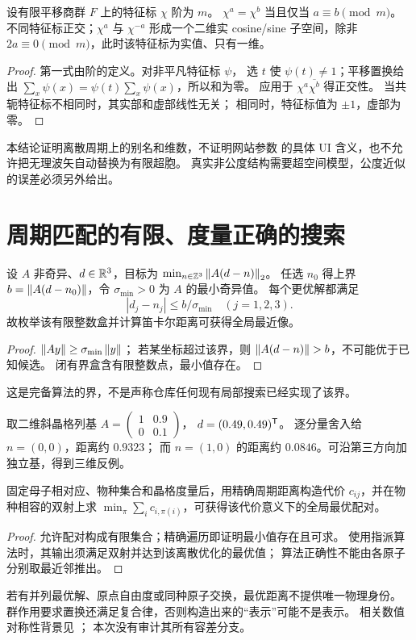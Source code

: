 \begin{theorem}[谐波别名和实模式维数]\label{thm:harmonics}
设有限平移商群 $F$ 上的特征标 $\chi$ 阶为 $m$。
$\chi^a=\chi^b$ 当且仅当 $a\equiv b\pmod m$。
不同特征标正交；$\chi^a$ 与 $\chi^{-a}$ 形成一个二维实
cosine/sine 子空间，除非 $2a\equiv0\pmod m$，此时该特征标为实值、只有一维。
\end{theorem}
\begin{proof}
第一式由阶的定义。对非平凡特征标 $\psi$，
选 $t$ 使 $\psi(t)\ne1$；平移置换给出
$\sum_x\psi(x)=\psi(t)\sum_x\psi(x)$，所以和为零。
应用于 $\chi^a\overline{\chi^b}$ 得正交性。
当共轭特征标不相同时，其实部和虚部线性无关；
相同时，特征标值为 $\pm1$，虚部为零。
\end{proof}
本结论证明离散周期上的别名和维数，不证明网站参数
 的具体 UI 含义，也不允许把无理波矢自动替换为有限超胞。
真实非公度结构需要超空间模型，公度近似的误差必须另外给出。

\section{周期匹配的有限、度量正确的搜索}\label{sec:matching}
\begin{theorem}[最近晶格像的完备有限界]
设 $A$ 非奇异、$d\in\mathbb R^3$，目标为
$\min_{n\in\mathbb Z^3}\left\lVert A(d-n)\right\rVert_2$。
任选 $n_0$ 得上界 $b=\left\lVert A(d-n_0)\right\rVert$，令 $\sigma_{\min}>0$ 为 $A$ 的最小奇异值。
每个更优解都满足
\[
 |d_j-n_j|\leq b/\sigma_{\min}\quad(j=1,2,3).
\]
故枚举该有限整数盒并计算笛卡尔距离可获得全局最近像。
\end{theorem}
\begin{proof}
$\left\lVert Ay\right\rVert\geq\sigma_{\min}\left\lVert y\right\rVert$；
若某坐标超过该界，则 $\left\lVert A(d-n)\right\rVert>b$，不可能优于已知候选。
闭有界盒含有限整数点，最小值存在。
\end{proof}
这是完备算法的界，不是声称仓库任何现有局部搜索已经实现了该界。
\begin{counterexample}[分数坐标逐分量舍入并不充分]
取二维斜晶格列基
$A=\left(\begin{smallmatrix}1&0.9\\0&0.1\end{smallmatrix}\right)$，
$d=(0.49,0.49)^\mathsf T$。
逐分量舍入给 $n=(0,0)$，距离约 $0.9323$；
而 $n=(1,0)$ 的距离约 $0.0846$。可沿第三方向加独立基，得到三维反例。
\end{counterexample}

\begin{proposition}[固定合同下的全局配对]
固定母子相对应、物种集合和晶格度量后，用精确周期距离构造代价
$c_{ij}$，并在物种相容的双射上求
$\min_\pi\sum_i c_{i,\pi(i)}$，可获得该代价意义下的全局最优配对。
\end{proposition}
\begin{proof}
允许配对构成有限集合；精确遍历即证明最小值存在且可求。
使用指派算法时，其输出须满足双射并达到该离散优化的最优值；
算法正确性不能由各原子分别取最近邻推出。
\end{proof}
若有并列最优解、原点自由度或同种原子交换，最优距离不提供唯一物理身份。
群作用要求置换还满足复合律，否则构造出来的“表示”可能不是表示。
相关数值对称性背景见 \citet{Findsym2005,Spglib2024}；
本次没有审计其所有容差分支。

